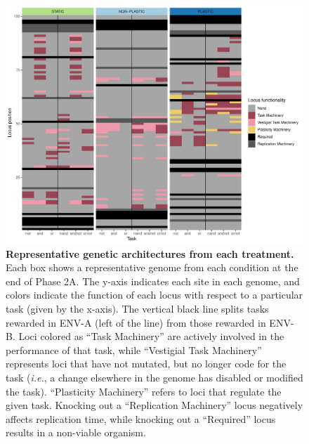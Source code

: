 \begin{figure}[ht!]
    \centering
    \includegraphics[width=1\textwidth]{chapters/03-evolutionary-consequences-of-plasticity/media/locus-slice-combined-color-facets.pdf}
    \caption{\small
    \textbf{Representative genetic architectures from each treatment.}
    Each box shows a representative genome from each condition at the end of Phase 2A. 
    The y-axis indicates each site in each genome, and colors indicate the function of each locus with respect to a particular task (given by the x-axis). 
    The vertical black line splits tasks rewarded in ENV-A (left of the line) from those rewarded in ENV-B.
    Loci colored as ``Task Machinery'' are actively involved in the performance of that task, while ``Vestigial Task Machinery'' represents loci that have not mutated, but no longer code for the task (\textit{i.e.}, a change elsewhere in the genome has disabled or modified the task). 
    ``Plasticity Machinery'' refers to loci that regulate the given task. 
    Knocking out a ``Replication Machinery'' locus negatively affects replication time, while knocking out a ``Required'' locus results in a non-viable organism. 
    }
    \label{chapter:consequences-of-plasticity:fig:architecture-locus-functionality}
\end{figure}